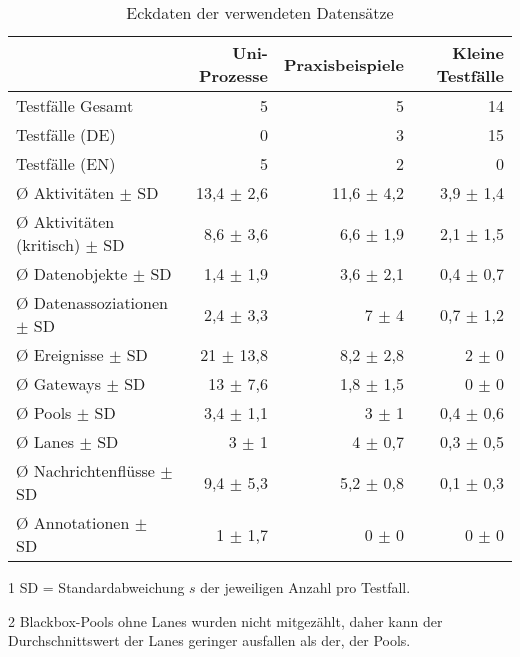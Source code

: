\begin{table}[htbp]
    \centering
    \begin{threeparttable}
    \caption{Eckdaten der verwendeten Datensätze}
    \label{tab:datensaetze-eckdaten}
    \begin{tabular}{l r r r}
        \toprule
        & Uni-Prozesse & Praxisbeispiele & Kleine Testfälle \\
        \midrule
        Testfälle Gesamt                  & 5  & 5 & 14 \\
        Testfälle (DE)                    & 0 & 3 & 15 \\
        Testfälle (EN)                    & 5 & 2 & 0 \\
        Ø Aktivitäten $\pm$ SD\tnote{1}   & 13,4 $\pm$ 2,6 & 11,6 $\pm$ 4,2 & 3,9 $\pm$ 1,4 \\
        Ø Aktivitäten (kritisch) $\pm$ SD & 8,6 $\pm$ 3,6 & 6,6 $\pm$ 1,9 & 2,1 $\pm$ 1,5 \\
        Ø Datenobjekte $\pm$ SD           & 1,4 $\pm$ 1,9 & 3,6 $\pm$ 2,1 & 0,4 $\pm$ 0,7 \\
        Ø Datenassoziationen $\pm$ SD     & 2,4 $\pm$ 3,3 & 7 $\pm$ 4 & 0,7 $\pm$ 1,2 \\
        Ø Ereignisse $\pm$ SD             & 21 $\pm$ 13,8 & 8,2 $\pm$ 2,8 & 2 $\pm$ 0 \\
        Ø Gateways $\pm$ SD               & 13 $\pm$ 7,6 & 1,8 $\pm$ 1,5 & 0 $\pm$ 0 \\
        Ø Pools $\pm$ SD                  & 3,4 $\pm$ 1,1 & 3 $\pm$ 1 & 0,4 $\pm$ 0,6 \\
        Ø Lanes $\pm$ SD\tnote{2}         & 3 $\pm$ 1 & 4 $\pm$ 0,7 & 0,3 $\pm$ 0,5 \\
        Ø Nachrichtenflüsse $\pm$ SD      & 9,4 $\pm$ 5,3 & 5,2 $\pm$ 0,8 & 0,1 $\pm$ 0,3 \\
        Ø Annotationen $\pm$ SD           & 1 $\pm$ 1,7 & 0 $\pm$ 0 & 0 $\pm$ 0 \\
        \bottomrule
    \end{tabular}
    \begin{tablenotes}
        \item[1] SD = Standardabweichung $s$ der jeweiligen Anzahl pro Testfall.
        \item[2] Blackbox-Pools ohne Lanes wurden nicht mitgezählt, daher kann der Durchschnittswert der Lanes geringer ausfallen als der, der Pools.
    \end{tablenotes}
    \end{threeparttable}
\end{table}